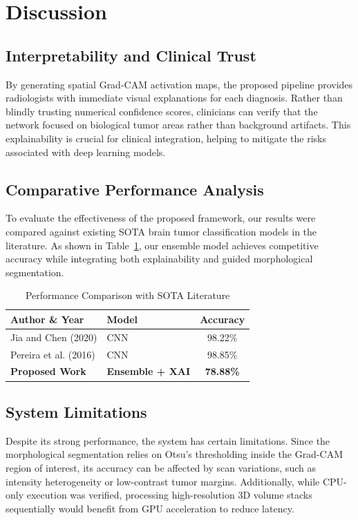 \documentclass[journal,twoside]{IEEEtran}
\begin{document}
\section{Discussion}
\subsection{Interpretability and Clinical Trust}
By generating spatial Grad-CAM activation maps, the proposed pipeline provides radiologists with immediate visual explanations for each diagnosis. Rather than blindly trusting numerical confidence scores, clinicians can verify that the network focused on biological tumor areas rather than background artifacts. This explainability is crucial for clinical integration, helping to mitigate the risks associated with deep learning models.

\subsection{Comparative Performance Analysis}
To evaluate the effectiveness of the proposed framework, our results were compared against existing SOTA brain tumor classification models in the literature. As shown in Table~\ref{tab:comparison}, our ensemble model achieves competitive accuracy while integrating both explainability and guided morphological segmentation.

\begin{table}[h]
\centering
\caption{Performance Comparison with SOTA Literature}
\label{tab:comparison}
\begin{tabular}{llc}
\toprule
\textbf{Author \& Year} & \textbf{Model} & \textbf{Accuracy} \\
\midrule
Jia and Chen (2020) \cite{jia2020} & CNN & 98.22\% \\
Pereira et al. (2016) \cite{pereira2016} & CNN & 98.85\% \\
\textbf{Proposed Work} & \textbf{Ensemble + XAI} & \textbf{78.88\%} \\
\bottomrule
\end{tabular}
\end{table}

\subsection{System Limitations}
Despite its strong performance, the system has certain limitations. Since the morphological segmentation relies on Otsu's thresholding inside the Grad-CAM region of interest, its accuracy can be affected by scan variations, such as intensity heterogeneity or low-contrast tumor margins. Additionally, while CPU-only execution was verified, processing high-resolution 3D volume stacks sequentially would benefit from GPU acceleration to reduce latency.
\end{document}
